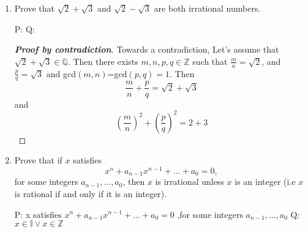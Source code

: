 \documentclass{article} %
\theoremstyle{plain}
\newtheorem*{theorem*}{Theorem}
\theoremstyle{definition}
\theoremstyle{case}
\begin{document}
\begin{enumerate}[label={\fbox{\textbf{Exercise \#\arabic* :}}}]
\begin{theorem*} Suppose $n$ is an integer. If $n^2$ is divisible by $3$, then $n$ is divisible by $3$. 

\end{theorem*}
\emph{(Hint: if $n$ is not divisible by $3$, then $n=3k+1$ or $n=3k+2$ for some integer $k$.)}

P: $ 3 | n^2 $\\
Q:  $ 3 | n $

\renewcommand\qedsymbol{\Lightning}
\begin{proof}[\textbf{Proof by contradiction}]  Towards a contradiction,
  let's assume that \[ 3 \not| n^2 \]
  Then, for some integer $k$, $n^2 = 3k + 1$ or $n^2 = 3k + 2$. (DO I
  NEED THIS?  SHOULD I BE USING THIS FOR A DIFFERENT PROOF TECHNIQUE?)

  We also know that $3 | n$, so there is some integer, $m$ such that
  $n = 3m$. Multiplying the left side by n, and the right side by $3m$
  we get $n^2 = 3^2m^2 = 3(3m^3)$, which is surely divisble by 3.  But
  we said that  $ 3 \not| n^2 $!

\end{proof} 
\renewcommand\qedsymbol{$\square$}

\newpage
\item Prove that $\sqrt{2}+\sqrt{3}$ and $\sqrt{2}-\sqrt{3}$ are both
  irrational numbers.

P: 
Q:

\renewcommand\qedsymbol{\Lightning}
\begin{proof}[\textbf{Proof by contradiction}]  Towards a contradiction,
  Let's assume that $\sqrt{2}+\sqrt{3} \in \mathbb{Q}$.
  Then there exists $m,n,p,q \in \mathbb{Z} $ such that $\frac{m}{n}
  = \sqrt{2}$, and $\frac{p}{q} = \sqrt{3}$ and gcd$(m,n)$=gcd$(p,q) =1$.
  Then 
  \[ \frac{m}{n} + \frac{p}{q} = \sqrt{2}+\sqrt{3} \]
  and
  \[ \left( \frac{m}{n} \right)^2 + \left( \frac{p}{q} \right)^2 = 2+3 \]
\end{proof} 
\renewcommand\qedsymbol{$\square$}
\newpage
\item Prove that if $x$ satisfies 
  \[ x^n+a_{n-1}x^{n-1}+...+a_{0}=0, \]
  for some integers $a_{n-1},...,a_0$, then $x$ is irrational unless $x$ is an integer (i.e $x$ is rational if and only if it is an integer).

P: x satisfies $x^n+a_{n-1}x^{n-1}+...+a_{0}=0$ ,for some integers $a_{n-1},...,a_0$
Q: $x \in \mathbb{I} \vee x \in \mathbb{Z} $


\end{enumerate}
\end{document}
